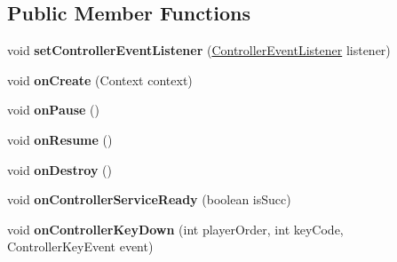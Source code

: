 \subsection*{Public Member Functions}
\begin{DoxyCompactItemize}
\item 
\mbox{\label{classorg_1_1cocos2dx_1_1lib_1_1GameControllerNibiru_a037a139101f891fd6884e236fb2bea05}} 
void {\bfseries set\+Controller\+Event\+Listener} (\hyperlink{interfaceorg_1_1cocos2dx_1_1lib_1_1GameControllerDelegate_1_1ControllerEventListener}{Controller\+Event\+Listener} listener)
\item 
\mbox{\label{classorg_1_1cocos2dx_1_1lib_1_1GameControllerNibiru_a710d2d4f56e7c0e8a9f538e3c1cc5c43}} 
void {\bfseries on\+Create} (Context context)
\item 
\mbox{\label{classorg_1_1cocos2dx_1_1lib_1_1GameControllerNibiru_a1a39418386333c314a35a2434e5904a4}} 
void {\bfseries on\+Pause} ()
\item 
\mbox{\label{classorg_1_1cocos2dx_1_1lib_1_1GameControllerNibiru_a5dfe22ec05a1ebae2ce01e7fb6210ee2}} 
void {\bfseries on\+Resume} ()
\item 
\mbox{\label{classorg_1_1cocos2dx_1_1lib_1_1GameControllerNibiru_a819d31288161c2555c98f817335c9d69}} 
void {\bfseries on\+Destroy} ()
\item 
\mbox{\label{classorg_1_1cocos2dx_1_1lib_1_1GameControllerNibiru_a65a937c4f5268ea9308582a03df134ed}} 
void {\bfseries on\+Controller\+Service\+Ready} (boolean is\+Succ)
\item 
\mbox{\label{classorg_1_1cocos2dx_1_1lib_1_1GameControllerNibiru_a6d4edf3b78e2b1325a3405aa6d1044d9}} 
void {\bfseries on\+Controller\+Key\+Down} (int player\+Order, int key\+Code, Controller\+Key\+Event event)
\item 
\mbox{\label{classorg_1_1cocos2dx_1_1lib_1_1GameControllerNibiru_a7c865fca3e0a72baac4ad346e5b6fefa}} 

\end{DoxyCompactItemize}
